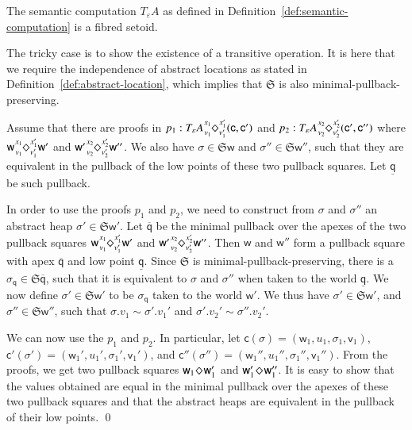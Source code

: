 \documentclass[orivec]{llncs}
\newcommand{\sq}[4]{\tensor*[^{#1}_{#2}]{\Diamond}{^{#3}_{#4}}}
\newcommand{\eff}{\varepsilon}
\renewenvironment{proof}{\vspace{-1mm} \noindent {\bf Proof}\quad}{\qed}
\newcommand\w{\ensuremath{\mathsf{w}}\xspace}
\newcommand\q{\ensuremath{\mathsf{q}}\xspace}
\newcommand{\Astores}{\mathfrak{S}}
\newcommand\val{\ensuremath{\mathsf{v}}\xspace}
\newcommand\cval{\ensuremath{\mathsf{c}}\xspace}
\begin{document}
\begin{proposition}
The semantic computation $T_\eff A$ as defined in
Definition~\ref{def:semantic-computation} is a fibred setoid.
\end{proposition}
\begin{proof}
  The tricky case is to show the existence of a transitive operation.
  It is here that we require the independence of abstract locations as
  stated in Definition~\ref{def:abstract-location}, which implies that
  $\Astores$ is also minimal-pullback-preserving.

Assume that there are proofs in $p_1 : T_\eff A \sq{x_1}{v_1}{x_1'}{v_1'}
(\cval, \cval')$ and $p_2 : T_\eff A \sq{x_2}{v_2}{x_2'}{v_2'} (\cval',
\cval'')$ where 
$\w \sq{x_1}{v_1}{x_1'}{v_1'} \w'$ and $\w' \sq{x_2}{v_2}{x_2'}{v_2'}
\w''$. We also have $\sigma \in \Astores \w$ and $\sigma'' \in \Astores
\w''$, such that they are equivalent in the pullback of
the low points of these two pullback squares. Let $\underline{\q}$ be such
pullback. 

In order to use the proofs $p_1$ and $p_2$, we need to construct
from $\sigma$ and $\sigma''$ an abstract heap $\sigma' \in \Astores\w'$.
Let $\overline{\q}$ be the minimal pullback over the apexes of the two pullback
squares $\w \sq{x_1}{v_1}{x_1'}{v_1'} \w'$ and $\w'
\sq{x_2}{v_2}{x_2'}{v_2'} \w''$. Then $\w$ and $\w''$ form a pullback
square with apex $\overline{\q}$ and low point $\underline{\q}$. Since
$\Astores$ is minimal-pullback-preserving, there is a $\sigma_{\q} \in \Astores
\overline{\q}$, such that it is equivalent to $\sigma$ and $\sigma''$ when
taken to the world $\underline{\q}$. We now define $\sigma' \in \Astores
\w'$ to be $\sigma_{\q}$ taken to the world $\w'$. We thus have $\sigma'
\in \Astores
\w'$, and $\sigma'' \in \Astores \w''$, such that $\sigma.v_1 \sim
\sigma'.v_1'$ and $\sigma'.v_2' \sim \sigma''.v_2'$.

We can now use the $p_1$ and $p_2$. In particular, 
let $\cval(\sigma) = (\w_1, u_1, \sigma_1, \val_1)$, $\cval'(\sigma') =
(\w_1', u_1', \sigma_1', \val_1')$, and $\cval''(\sigma'') = (\w_1'',
u_1'', \sigma_1'', \val_1'')$. From the proofs, we get two
pullback squares $\w_1\sq{}{}{}{}\w_1'$ and $\w_1'\sq{}{}{}{}\w_1''$. It
is easy to show that the values obtained are equal in the minimal pullback over 
the
apexes of these two pullback squares and that the abstract heaps are
equivalent in the pullback of their low points.
\end{proof} 
\end{document}
